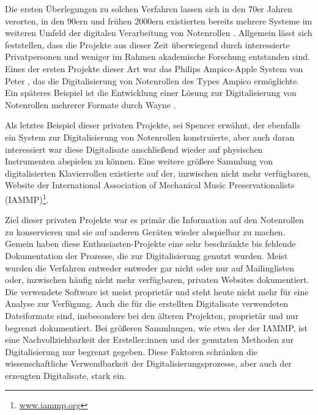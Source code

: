 Die ersten Überlegungen zu solchen Verfahren lassen sich in den 70er Jahren verorten, in den 90ern und frühen 2000ern existierten bereits mehrere Systeme im weiteren Umfeld der digitalen Verarbeitung von Notenrollen \parencite[63]{colmenares_2011}.
Allgemein lässt sich feststellen, dass die Projekte aus dieser Zeit überwiegend durch interessierte Privatpersonen und weniger im Rahmen akademische Forschung entstanden sind.
Eines der ersten Projekte dieser Art war das Philips Ampico-Apple System von Peter \textcite[]{stephens}, das die Digitalisierung von Notenrollen des Types Ampico ermöglichte.
Ein späteres Beispiel ist die Entwicklung einer Lösung zur Digitalisierung von Notenrollen mehrerer Formate durch Wayne \textcite[]{stahnke_1996}.

Als letztes Beispiel dieser privaten Projekte, sei Spencer \textcite[]{chase_2003} erwähnt, der ebenfalls ein System zur Digitalisierung von Notenrollen konstruierte, aber auch daran interessiert war diese Digitalisate anschließend wieder auf physischen Instrumenten abspielen zu können.
Eine weitere größere Sammlung von digitalisierten Klavierrollen existierte auf der, inzwischen nicht mehr verfügbaren, Website der International Association of Mechanical Music Preservationalists (IAMMP)\footnote{\href{http://www.iammp.org/}{www.iammp.org}}.

Ziel dieser privaten Projekte war es primär die Information auf den Notenrollen zu konservieren und sie auf anderen Geräten wieder abspielbar zu machen.
Gemein haben diese Enthusiasten-Projekte eine sehr beschränkte bis fehlende Dokumentation der Prozesse, die zur Digitalisierung genutzt wurden.
Meist wurden die Verfahren entweder entweder gar nicht oder nur auf Mailinglisten oder, inzwischen häufig nicht mehr verfügbaren, privaten Websites dokumentiert.
Die verwendete Software ist meist proprietär und steht heute nicht mehr für eine Analyse zur Verfügung.
Auch die für die erstellten Digitalisate verwendeten Dateiformate sind, insbesondere bei den älteren Projekten, proprietär und nur begrenzt dokumentiert.
Bei größeren Sammlungen, wie etwa der der IAMMP, ist eine Nachvollziehbarkeit der Ersteller:innen und der genutzten Methoden zur Digitalisierung nur begrenzt gegeben.
Diese Faktoren schränken die wissenschaftliche Verwendbarkeit der Digitalisierungsprozesse, aber auch der erzeugten Digitalisate, stark ein.


